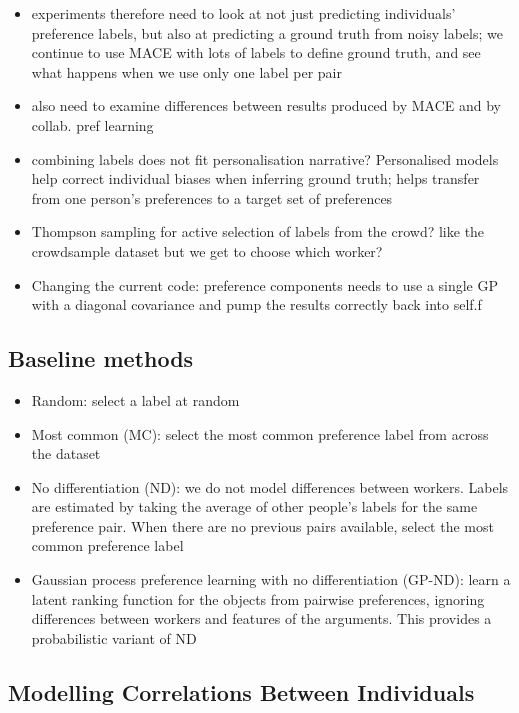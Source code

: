 \begin{itemize}
  \item experiments therefore need to look at not just predicting individuals' preference labels, but also at
  predicting a ground truth from noisy labels; we continue to use MACE with lots of labels to define ground truth,
  and see what happens when we use only one label per pair
  \item also need to examine differences between results produced by MACE and by collab. pref learning
  \item combining labels does not fit personalisation narrative? Personalised models help correct individual biases
  when inferring ground truth; helps transfer from one person's preferences to a target set of preferences
  \item Thompson sampling for active selection of labels from the crowd? like the crowdsample dataset but we get
  to choose which worker?
  \item Changing the current code: preference components needs to use a single GP with a diagonal covariance 
  and pump the results correctly back into self.f
\end{itemize}


\subsection{Baseline methods}

\begin{itemize}
  \item Random: select a label at random
  \item Most common (MC): select the most common preference label from across the dataset
  \item No differentiation (ND): we do not model differences between workers. Labels are estimated by taking the average of other people's labels for the same preference pair. When there are no previous pairs available, select the most common preference label
  \item Gaussian process preference learning with no differentiation (GP-ND): learn a latent ranking function for the objects from pairwise preferences, ignoring differences between workers and features of the arguments. This provides a probabilistic variant of ND  
\end{itemize}

\subsection{Modelling Correlations Between Individuals}

